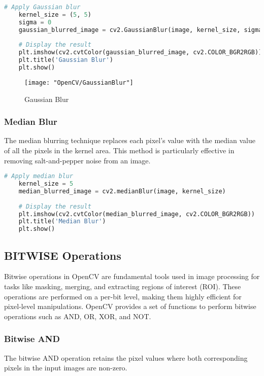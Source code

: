 \begin{lstlisting}[language=Python, caption=Gaussian Blur]
	# Apply Gaussian blur
	kernel_size = (5, 5)
	sigma = 0
	gaussian_blurred_image = cv2.GaussianBlur(image, kernel_size, sigma)
	
	# Display the result
	plt.imshow(cv2.cvtColor(gaussian_blurred_image, cv2.COLOR_BGR2RGB))
	plt.title('Gaussian Blur')
	plt.show()
\end{lstlisting}

\begin{figure}[h]
	\centering
	\texttt{[image: "OpenCV/GaussianBlur"]}
	\caption{Gaussian Blur}\label{Gaussian Blur Image}
\end{figure}

\subsubsection{Median Blur}
The median blurring technique replaces each pixel's value with the median value of all the pixels in the kernel area. This method is particularly effective in removing salt-and-pepper noise from an image.\cite{OpenCVTeam:2024}

\begin{lstlisting}[language=Python, caption=Median Blur]
	# Apply median blur
	kernel_size = 5
	median_blurred_image = cv2.medianBlur(image, kernel_size)
	
	# Display the result
	plt.imshow(cv2.cvtColor(median_blurred_image, cv2.COLOR_BGR2RGB))
	plt.title('Median Blur')
	plt.show()
\end{lstlisting}

\subsection{BITWISE Operations}

Bitwise operations in OpenCV are fundamental tools used in image processing for tasks like masking, merging, and extracting regions of interest (ROI). These operations are performed on a per-bit level, making them highly efficient for pixel-level manipulations. OpenCV provides a set of functions to perform bitwise operations such as AND, OR, XOR, and NOT.

\subsubsection{Bitwise AND}
The bitwise AND operation retains the pixel values where both corresponding pixels in the input images are non-zero. 

